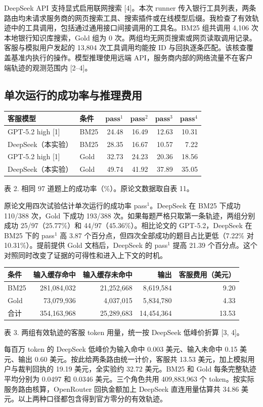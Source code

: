 \documentclass{article}
\begin{document}
DeepSeek API 支持显式启用联网搜索 [4]。本次 runner 传入银行工具列表，两条路由均未请求服务商的网页搜索工具、搜索插件或在线模型后缀。我检查了有效轨迹中的工具调用，包括通过通用接口间接调用的工具名。BM25 组共调用 4,106 次本地银行知识库搜索，Gold 组为 0 次。两组均无网页搜索或网页读取调用记录。客服与模拟用户发起的 13,804 次工具调用均能按 ID 与回执逐条匹配。该核查覆盖基准内执行的操作。模型推理使用远端 API，服务商内部的网络流量不在客户端轨迹的观测范围内 [2--4]。

\subsection{单次运行的成功率与推理费用}
\begin{center}\small
\begin{tabular}{llrrrr}
\hline 客服模型 & 条件 & pass$^1$ & pass$^2$ & pass$^3$ & pass$^4$\\\hline
GPT-5.2 high [1] & BM25 & 24.48 & 16.49 & 12.63 & 10.31\\
DeepSeek（本实验） & BM25 & 28.35 & 16.67 & 10.57 & 7.22\\
GPT-5.2 high [1] & Gold & 32.73 & 24.23 & 20.36 & 18.56\\
DeepSeek（本实验） & Gold & 49.74 & 41.92 & 37.89 & 35.05\\\hline
\end{tabular}\par
表 2. 相同 97 道题上的成功率（\%）。原论文数据取自表 11。
\end{center}
原论文用四次试验估计单次运行的成功率 pass$^1$。DeepSeek 在 BM25 下成功 110/388 次，Gold 下成功 193/388 次。如果每题严格只取第一条轨迹，两组分别成功 25/97（25.77\%）和 44/97（45.36\%）。相比论文的 GPT-5.2，DeepSeek 在 BM25 下的 pass$^1$ 高 3.87 个百分点，但四次全部成功的题目占比更低（7.22\% 对 10.31\%）。提前提供 Gold 文档后，DeepSeek 的 pass$^1$ 提高 21.39 个百分点。这个对照同时改变了证据的可得性和进入上下文的时机。

\begin{center}\small
\begin{tabular}{lrrrr}
\hline 条件 & 输入缓存命中 & 输入缓存未命中 & 输出 & 客服费用（美元）\\\hline
BM25 & 281,084,032 & 21,252,668 & 8,619,584 & 9.20\\
Gold & 73,079,936 & 4,037,015 & 5,834,780 & 4.33\\
合计 & 354,163,968 & 25,289,683 & 14,454,364 & 13.53\\\hline
\end{tabular}\par
表 3. 两组有效轨迹的客服 token 用量，统一按 DeepSeek 低峰价折算 [3, 4]。
\end{center}
每百万 token 的 DeepSeek 低峰价为输入命中 0.003 美元、输入未命中 0.15 美元、输出 0.60 美元。按此给两条路由统一计价，客服共 13.53 美元，加上模拟用户与裁判回执的 19.19 美元，全实验约 32.72 美元。BM25 和 Gold 每条完整轨迹平均分别为 0.0497 和 0.0346 美元。三个角色共用 409,883,963 个 token。按实际服务路由核算，OpenRouter 回执金额加上 DeepSeek 直连用量估算共 34.86 美元。以上两种口径都包含得到官方零分的有效轨迹。
\end{document}
